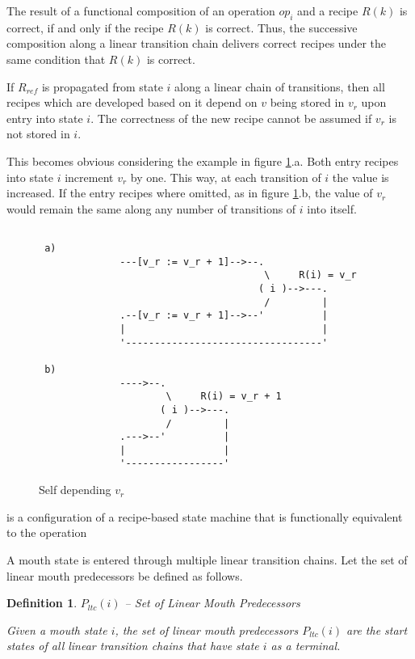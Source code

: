 \documentclass[12pt,a4paper]{scrartcl}
\newtheorem{definition}{Definition}
\begin{document}
The result of a functional composition of an operation $op_i$ and a recipe
$R(k)$ is correct, if and only if the recipe $R(k)$ is correct. Thus, the
successive composition along a linear transition chain delivers correct
recipes under the same condition that $R(k)$ is correct. 


If $R_{ref}$ is propagated from state $i$ along a linear chain of
transitions, then all recipes which are developed based on it depend on $v$
being stored in $v_r$ upon entry into state $i$.  The correctness of the new
recipe cannot be assumed if $v_r$ is not stored in $i$. 

This becomes obvious considering the example in figure \ref{fig:no-coherence}.a.
Both entry recipes into state $i$ increment $v_r$ by one. This way, at each
transition of $i$ the value is increased. If the entry recipes where omitted,
as in figure \ref{fig:no-coherence}.b, the value of $v_r$ would remain the same
along any number of transitions of $i$ into itself.



\begin{figure}[htbp] \leavevmode \label{fig:no-coherence}
\begin{verbatim}

 a)
              ---[v_r := v_r + 1]-->--.  
                                       \     R(i) = v_r
                                      ( i )-->---.
                                       /         |
              .--[v_r := v_r + 1]-->--'          |
              |                                  |
              '----------------------------------'

 b)
              ---->--.  
                      \     R(i) = v_r + 1
                     ( i )-->---.
                      /         |
              .--->--'          |
              |                 |
              '-----------------'

\end{verbatim}
\caption{Self depending $v_r$}
\end{figure}


is a configuration of a recipe-based state machine that is functionally
equivalent to the operation

A mouth state is entered through multiple linear transition chains. Let the set 
of linear mouth predecessors be defined as follows. 

\begin{definition} $P_{ltc}(i)$ -- Set of Linear Mouth Predecessors

    Given a mouth state $i$, the set of linear mouth predecessors $P_{ltc}(i)$
    are the start states of all linear transition chains that have state $i$ as
    a terminal.
    
\end{definition}
\end{document}
